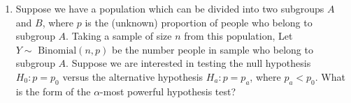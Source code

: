\documentclass[12pt]{article}
\begin{document}
\begin{enumerate}
\item Suppose we have a population which can be divided into two subgroups $A$ and $B$, where $p$ is the (unknown) proportion of people who belong to subgroup $A$. Taking a sample of size $n$ from this population, Let $Y \sim \text{ Binomial}(n, p)$ be the number people in sample who belong to subgroup $A$. Suppose we are interested in testing the null hypothesis $H_0: p = p_0$ versus the alternative hypothesis $H_a: p = p_a$, where $p_a < p_0$. What is the form of the $\alpha$-most powerful hypothesis test?

\end{enumerate}
\end{document}
